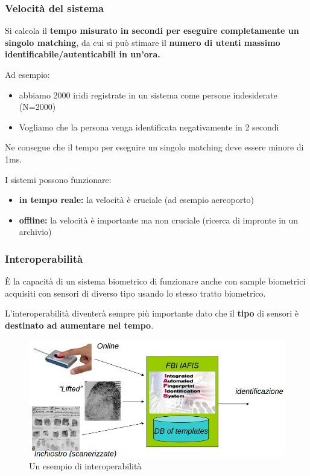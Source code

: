 \subsubsection{Velocità del sistema}

Si calcola il \textbf{tempo misurato in secondi per eseguire completamente un singolo matching}, da cui si può stimare il \textbf{numero di utenti massimo identificabile/autenticabili in un'ora.}

\noindent Ad esempio:
\begin{itemize}
    \item abbiamo 2000 iridi registrate in un sistema come persone indesiderate (N=2000)
    \item Vogliamo che la persona venga identificata negativamente in 2 secondi
\end{itemize}
Ne consegue che il tempo per eseguire un singolo matching deve essere minore di 1ms.

I sistemi possono funzionare:
\begin{itemize}
    \item \textbf{in tempo reale:} la velocità è cruciale (ad esempio aereoporto)
    \item \textbf{offline:} la velocità è importante ma non cruciale (ricerca di impronte in un archivio)
\end{itemize}

\subsubsection{Interoperabilità}

È la capacità di un sistema biometrico di funzionare anche con sample biometrici acquisiti con sensori di diverso tipo usando lo stesso tratto biometrico.

\noindent L'interoperabilità diventerà sempre più importante dato che il \textbf{tipo} di sensori è \textbf{destinato ad aumentare nel tempo}.

\begin{figure}[h]
    \centering
    \includegraphics[width=0.95\linewidth]{chapters/images-chap1/interoperabilita.png}
    \caption{Un esempio di interoperabilità}
    \label{fig:interoperabilita}
\end{figure}

